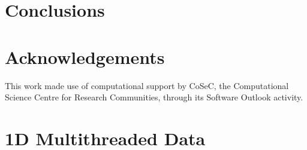\documentclass[a4paper]{article}
\begin{document}
\section{Conclusions}\label{Sec:Conclusions}


\section*{Acknowledgements}
This work made use of computational support by CoSeC, the
Computational Science Centre for Research Communities, through its
Software Outlook activity.




\clearpage

\appendix

\section{1D Multithreaded Data}\label{App:1Dthr}
\end{document}
